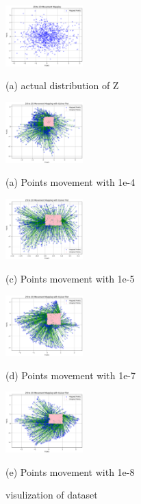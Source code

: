 \documentclass{article}
\begin{document}
\begin{figure}[htb]
  \begin{minipage}[b]{1.0\linewidth}
    \centering
    \centerline{\includegraphics[width=3.0cm]{images/q4_act}}
   \centerline{(a) actual distribution of Z }\medskip
  \end{minipage}
  \begin{minipage}[b]{.48\linewidth}
    \centering
    \centerline{\includegraphics[width=3.0cm]{images/q4_pred_1e-4}}
    \centerline{(a) Points movement with 1e-4}\medskip
  \end{minipage}
  \hfill
  \begin{minipage}[b]{0.48\linewidth}
    \centering
    \centerline{\includegraphics[width=3.0cm]{images/q4_pred_1e-5}}
    \centerline{(c) Points movement with 1e-5}\medskip
  \end{minipage}
  \begin{minipage}[b]{.48\linewidth}
    \centering
    \centerline{\includegraphics[width=3.0cm]{images/q4_pred_1e-7}}
    \centerline{(d) Points movement with 1e-7}\medskip
  \end{minipage}
  \hfill
  \begin{minipage}[b]{0.48\linewidth}
    \centering
    \centerline{\includegraphics[width=3.0cm]{images/q4_pred_1e-8}}
    \centerline{(e) Points movement with 1e-8}\medskip
  \end{minipage}
  \caption{visulization of dataset}
  \label{fig:q4}
  \end{figure}
\end{document}

